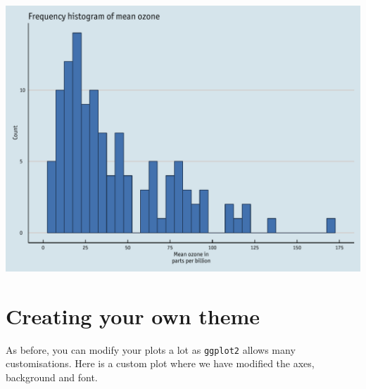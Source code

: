 \begin{center}\includegraphics[width=0.55\linewidth]{figures/histogram_15-1} \end{center}

\section{Creating your own theme}\label{creating-your-own-theme-6}

As before, you can modify your plots a lot as \texttt{ggplot2} allows
many customisations. Here is a custom plot where we have modified the
axes, background and font.

